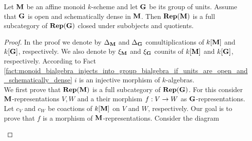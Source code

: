 \begin{theorem}\label{theorem:full_subcategory_closed_under_subobjects_and_quotients}
Let $\mathbf{M}$ be an affine monoid $k$-scheme and let $\mathbf{G}$ be its group of units. Assume that $\mathbf{G}$ is open and schematically dense in $\mathbf{M}$. Then $\mathbf{Rep}(\mathbf{M})$ is a full subcategory of $\mathbf{Rep}(\mathbf{G})$ closed under subobjects and quotients.
\end{theorem}
\begin{proof}
In the proof we denote by $\Delta_{\mathbf{M}}$ and $\Delta_{\mathbf{G}}$ comultiplications of $k[\mathbf{M}]$ and $k[\mathbf{G}]$, respectively. We also denote by $\xi_{\mathbf{M}}$ and $\xi_{\mathbf{G}}$ counits of $k[\mathbf{M}]$ and $k[\mathbf{G}]$, respectively. According to Fact \ref{fact:monoid_bialgebra_injects_into_group_bialgebra_if_units_are_open_and_schematically_dense} $i$ is an injective morphism of $k$-algebras.\\
We first prove that $\mathbf{Rep}(\mathbf{M})$ is a full subcategory of $\mathbf{Rep}(\mathbf{G})$. For this consider $\mathbf{M}$-representations $V,W$ and a their morphism $f:V\rightarrow W$ as $\mathbf{G}$-representations. Let $c_V$ and $c_W$ be coactions of $k[\mathbf{M}]$ on $V$ and $W$, respectively. Our goal is to prove that $f$ is a morphism of $\mathbf{M}$-representations. Consider the diagram
\begin{center}
\end{center}
\end{proof}
